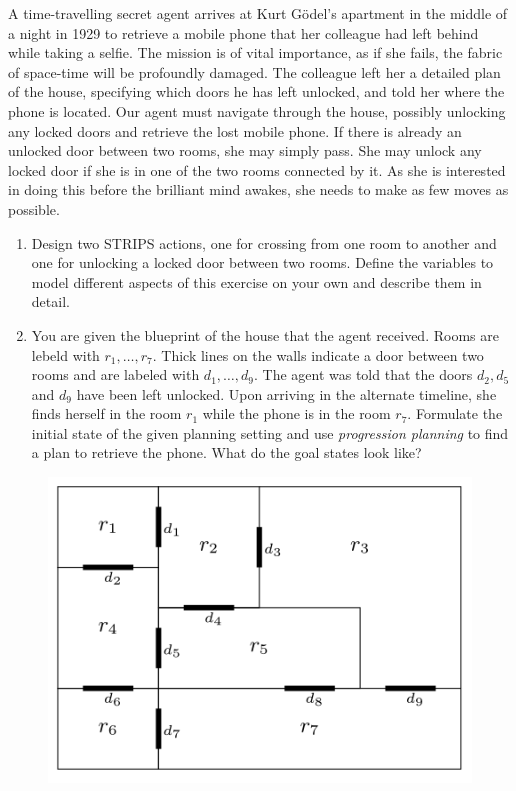 A time-travelling secret agent arrives at Kurt Gödel’s apartment in the middle of a night in 1929 to retrieve a mobile phone that her colleague had left behind while taking a selfie. The mission is of vital importance, as if she fails, the fabric of space-time will be profoundly damaged. The colleague left her a detailed plan of the house, specifying which doors he has left unlocked, and told her where the phone is located. Our agent must navigate through the house, possibly unlocking any locked doors and retrieve the lost mobile phone. If there is already an unlocked door between two rooms, she may simply pass. She may unlock any locked door if she is in one of the two rooms connected by it. As she is interested in doing this before the brilliant mind awakes, she needs to make as few moves as possible. 

\begin{enumerate}[label=(\alph*)]
    \item  Design two STRIPS actions, one for crossing from one room to another and one for unlocking a locked door between two rooms. Define the variables to model different aspects of this exercise on your own and describe them in detail.
    \item You are given the blueprint of the house that the agent received. Rooms are lebeld with $r_1,\ldots ,r_7$. Thick lines on the walls indicate a door between two rooms and are labeled with $d_1,\ldots ,d_9$. The agent was told that the doors $d_2,d_5$ and $d_9$ have been left unlocked. Upon arriving in the alternate timeline, she finds herself in the room $r_1$ while the phone is in the room $r_7$. Formulate the initial state of the given planning setting and use \textit{progression planning} to find a plan to retrieve the phone. What do the goal states look like?
\end{enumerate}

\begin{figure}[h!]
    \centering
    \includegraphics[scale=0.5]{img/room.png}
\end{figure}

